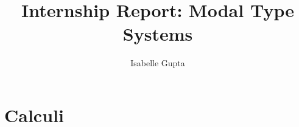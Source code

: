 \documentclass[acmsmall,screen,nonacm]{acmart}
\begin{document}
\title{Internship Report: Modal Type Systems}

\author{Isabelle Gupta}








\maketitle

\section{Calculi}
\end{document}
